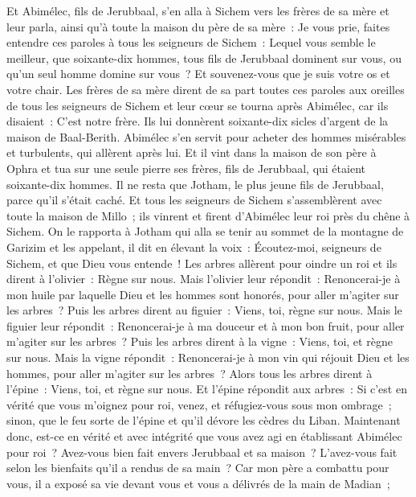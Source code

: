 \begin{multicols}{2}
\VerseOne{}Et Abimélec, fils de Jerubbaal, s'en alla à Sichem vers les frères de sa mère et leur parla, ainsi qu'à toute la maison du père de sa mère~:
Je vous prie, faites entendre ces paroles à tous les seigneurs de Sichem~: Lequel vous semble le meilleur, que soixante-dix hommes, tous fils de Jerubbaal dominent sur vous, ou qu'un seul homme domine sur vous~? Et souvenez-vous que je suis votre os et votre chair.
Les frères de sa mère dirent de sa part toutes ces paroles aux oreilles de tous les seigneurs de Sichem et leur cœur se tourna après Abimélec, car ils disaient~: C'est notre frère.
Ils lui donnèrent soixante-dix sicles d'argent de la maison de Baal-Berith. Abimélec s'en servit pour acheter des hommes misérables et turbulents, qui allèrent après lui.
Et il vint dans la maison de son père à Ophra et tua sur une seule pierre ses frères, fils de Jerubbaal, qui étaient soixante-dix hommes. Il ne resta que Jotham, le plus jeune fils de Jerubbaal, parce qu'il s'était caché.
Et tous les seigneurs de Sichem s'assemblèrent avec toute la maison de Millo~; ils vinrent et firent d'Abimélec leur roi près du chêne à Sichem.
On le rapporta à Jotham qui alla se tenir au sommet de la montagne de Garizim et les appelant, il dit en élevant la voix~: Écoutez-moi, seigneurs de Sichem, et que Dieu vous entende~!
Les arbres allèrent pour oindre un roi et ils dirent à l'olivier~: Règne sur nous.
Mais l'olivier leur répondit~: Renoncerai-je à mon huile par laquelle Dieu et les hommes sont honorés, pour aller m'agiter sur les arbres~?
Puis les arbres dirent au figuier~: Viens, toi, règne sur nous.
Mais le figuier leur répondit~: Renoncerai-je à ma douceur et à mon bon fruit, pour aller m'agiter sur les arbres~?
Puis les arbres dirent à la vigne~: Viens, toi, et règne sur nous.
Mais la vigne répondit~: Renoncerai-je à mon vin qui réjouit Dieu et les hommes, pour aller m'agiter sur les arbres~?
Alors tous les arbres dirent à l'épine~: Viens, toi, et règne sur nous.
Et l'épine répondit aux arbres~: Si c'est en vérité que vous m'oignez pour roi, venez, et réfugiez-vous sous mon ombrage~; sinon, que le feu sorte de l'épine et qu'il dévore les cèdres du Liban.
Maintenant donc, est-ce en vérité et avec intégrité que vous avez agi en établissant Abimélec pour roi~? Avez-vous bien fait envers Jerubbaal et sa maison~? L'avez-vous fait selon les bienfaits qu'il a rendus de sa main~?
Car mon père a combattu pour vous, il a exposé sa vie devant vous et vous a délivrés de la main de Madian~;

\end{multicols}

